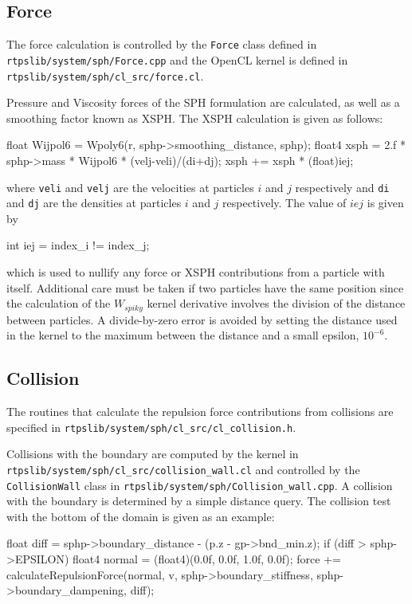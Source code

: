 \subsection{Force}
The force calculation is controlled by the \verb|Force| class defined in
{\tt rtpslib/system/sph/Force.cpp} and the OpenCL kernel is defined in
\verb|rtpslib/system/sph/cl_src/force.cl|. 


Pressure and Viscosity forces of the SPH formulation
are calculated, as well as a smoothing factor known as XSPH.\cite{Krog2010} The XSPH
calculation is given as follows:

\begin{cppcode}{0}
    float Wijpol6 = Wpoly6(r, sphp->smoothing_distance, sphp);
    float4 xsph = 2.f * sphp->mass * Wijpol6 * (velj-veli)/(di+dj);
    xsph += xsph * (float)iej;
\end{cppcode}

\noindent where \verb|veli| and \verb|velj| are the velocities at particles $i$ and $j$
respectively and \verb|di| and \verb|dj| are the densities at particles $i$ and $j$
respectively. The value of $iej$ is given by

\begin{cppcode}{0}
int iej = index_i != index_j;
\end{cppcode}

\noindent which is used to nullify any force or XSPH contributions from a particle with
itself. Additional care must be taken if two particles have the same
position since the calculation of the $W_{spiky}$ kernel derivative involves
the division of the distance between particles. A divide-by-zero error is
avoided by setting the distance used in the kernel to the maximum between the
distance and a small epsilon, $10^{-6}$.


\subsection{Collision}
The routines that calculate the repulsion force contributions
from collisions are specified in 
\verb|rtpslib/system/sph/cl_src/cl_collision.h|.

Collisions with the boundary are computed by the kernel in
\\ \verb|rtpslib/system/sph/cl_src/collision_wall.cl| and controlled by the
\verb|CollisionWall| class in \verb|rtpslib/system/sph/Collision_wall.cpp|.
A collision with the boundary is determined by a simple distance query. The
collision test with the bottom of the domain is given as an example: 
\begin{cppcode}{0}
float diff = sphp->boundary_distance - (p.z - gp->bnd_min.z);
if (diff > sphp->EPSILON)
{
    float4 normal = (float4)(0.0f, 0.0f, 1.0f, 0.0f);
    force += calculateRepulsionForce(normal, v, sphp->boundary_stiffness, 
            sphp->boundary_dampening, diff);
}
\end{cppcode}

